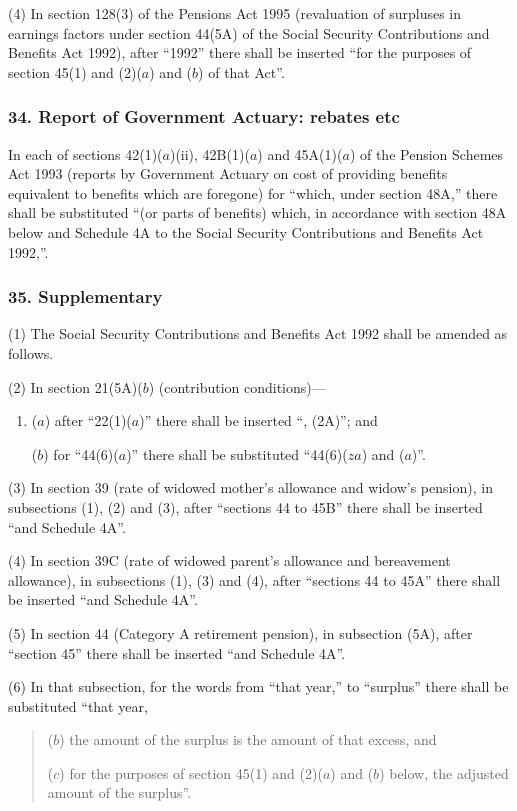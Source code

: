 \documentclass[12pt,a4paper]{article}
\begin{document}
(4) In section 128(3)  of the Pensions Act 1995 (revaluation of surpluses in earnings factors under section 44(5A)  of the Social Security Contributions and Benefits Act 1992), after “1992” there shall be inserted “for the purposes of section 45(1)  and (2)($a$)  and ($b$)  of that Act”.

\subsubsection{34. Report of Government Actuary: rebates etc}

In each of sections 42(1)($a$)(ii), 42B(1)($a$)  and 45A(1)($a$)  of the Pension Schemes Act 1993 (reports by Government Actuary on cost of providing benefits equivalent to benefits which are foregone) for “which, under section 48A,” there shall be substituted “(or parts of benefits) which, in accordance with section 48A below and Schedule 4A to the Social Security Contributions and Benefits Act 1992,”.

\subsubsection{35. Supplementary}

(1) The Social Security Contributions and Benefits Act 1992 shall be amended as follows.

(2) In section 21(5A)($b$)  (contribution conditions)—
\begin{enumerate}\item[]
($a$) after “22(1)($a$)” there shall be inserted “, (2A)”; and

($b$) for “44(6)($a$)” there shall be substituted “44(6)($za$)  and ($a$)”.
\end{enumerate}

(3) In section 39 (rate of widowed mother’s allowance and widow’s pension), in subsections (1), (2)  and (3), after “sections 44 to 45B” there shall be inserted “and Schedule 4A”.

(4) In section 39C (rate of widowed parent’s allowance and bereavement allowance), in subsections (1), (3)  and (4), after “sections 44 to 45A” there shall be inserted “and Schedule 4A”.

(5) In section 44 (Category A retirement pension), in subsection (5A), after “section 45” there shall be inserted “and Schedule 4A”.

(6) In that subsection, for the words from “that year,” to “surplus” there shall be substituted “that year,
\begin{quotation}
($b$) the amount of the surplus is the amount of that excess, and

($c$) for the purposes of section 45(1)  and (2)($a$)  and ($b$)  below, the adjusted amount of the surplus”.
\end{quotation}
\end{document}
